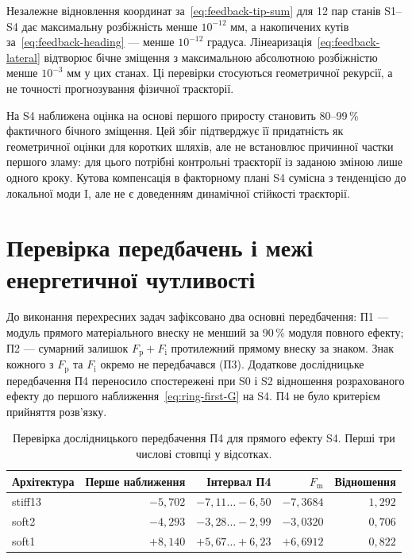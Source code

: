 Незалежне відновлення координат за~\eqref{eq:feedback-tip-sum} для 12 пар станів S1--S4 дає максимальну розбіжність менше $10^{-12}$ мм, а накопичених кутів за~\eqref{eq:feedback-heading} --- менше $10^{-12}$ градуса. Лінеаризація~\eqref{eq:feedback-lateral} відтворює бічне зміщення з максимальною абсолютною розбіжністю менше $10^{-3}$ мм у цих станах. Ці перевірки стосуються геометричної рекурсії, а не точності прогнозування фізичної траєкторії.

На S4 наближена оцінка на основі першого приросту становить 80--99\,\% фактичного бічного зміщення. Цей збіг підтверджує її придатність як геометричної оцінки для коротких шляхів, але не встановлює причинної частки першого зламу: для цього потрібні контрольні траєкторії із заданою зміною лише одного кроку. Кутова компенсація в факторному плані S4 сумісна з тенденцією до локальної моди I, але не є доведенням динамічної стійкості траєкторії.

\section{Перевірка передбачень і межі енергетичної чутливості}
\label{sec:feedback-predictions}

До виконання перехресних задач зафіксовано два основні передбачення: П1 --- модуль прямого матеріального внеску не менший за 90\,\% модуля повного ефекту; П2 --- сумарний залишок $F_{\mathrm p}+F_{\mathrm i}$ протилежний прямому внеску за знаком. Знак кожного з $F_{\mathrm p}$ та $F_{\mathrm i}$ окремо не передбачався (П3). Додаткове дослідницьке передбачення П4 переносило спостережені при S0 і S2 відношення розрахованого ефекту до першого наближення~\eqref{eq:ring-first-G} на S4. П4 не було критерієм прийняття розв'язку.

\begin{table}[htbp]
 \centering
 \caption{Перевірка дослідницького передбачення П4 для прямого ефекту S4. Перші три числові стовпці у відсотках.}
 \label{tab:feedback-p4}
 \begin{tabular}{lrrrr}
 \toprule
 Архітектура & Перше наближення & Інтервал П4 & $F_{\mathrm m}$ & Відношення\\
 \midrule
stiff13 & $-5,702$ & $-7{,}11\ldots-6{,}50$ & $-7,3684$ & $1,292$ \\
soft2 & $-4,293$ & $-3{,}28\ldots-2{,}99$ & $-3,0320$ & $0,706$ \\
soft1 & $+8,140$ & $+5{,}67\ldots+6{,}23$ & $+6,6912$ & $0,822$ \\

 \bottomrule
 \end{tabular}
\end{table}

